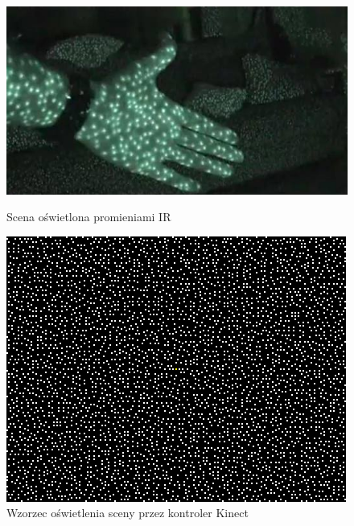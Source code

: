 \begin{savenotes}
	\begin{figure}[!htb]
		\centering
		\begin{minipage}[b]{0.48\linewidth}
			\centering   
			\includegraphics[width=\textwidth]{images/kinectNightVision.jpg}	
			\caption[Scena oświetlona promieniami podczerwonymi]{Scena oświetlona promieniami IR}
			\label{fig:characteristics:kinect:nightVision}
		\end{minipage}
		\hfill
		\begin{minipage}[b]{0.48\linewidth}
			\centering 
			\includegraphics[width=\textwidth]{images/kinect-pattern_3x3.png}
			\caption[Wzorzec oświetlenia sceny przez kontroler Kinect]{Wzorzec oświetlenia sceny przez kontroler Kinect }
			\label{fig:characteristics:kinect:dotPattern}
		\end{minipage}	
	\end{figure}
\end{savenotes}
																																	
